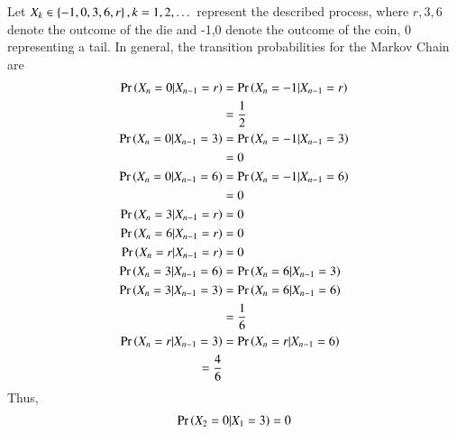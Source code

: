 Let $X_k \in \left\{-1,0,3,6,r\right\}, k = 1,2, \dots$ represent the described process, where $r,3,6$ denote the outcome of the die and -1,0 denote the outcome of the coin, 0 representing a tail.  In general, the transition probabilities for the Markov Chain are
\begin{align}
\Pr\left(X_n = 0|X_{n-1} = r\right) &=\Pr\left(X_n = -1|X_{n-1} = r\right) 
\\
&= \frac{1}{2}
\\
\Pr\left(X_n = 0|X_{n-1} = 3\right) &=\Pr\left(X_n = -1|X_{n-1} = 3\right) 
\\
&=0
\\
\Pr\left(X_n = 0|X_{n-1} = 6\right) &=\Pr\left(X_n = -1|X_{n-1} = 6\right) 
\\
&=0
\\
\Pr\left(X_n = 3|X_{n-1} = r\right) &= 0
\\
\Pr\left(X_n = 6|X_{n-1} = r\right) &= 0
\\
\Pr\left(X_n = r|X_{n-1} = r\right) &= 0
\\
\Pr\left(X_n = 3|X_{n-1} = 6\right) &= 
\Pr\left(X_n = 6|X_{n-1} = 3\right) 
\\
\Pr\left(X_n = 3|X_{n-1} = 3\right) &= 
\Pr\left(X_n = 6|X_{n-1} = 6\right) 
\\
&= \frac{1}{6}
\\
\Pr\left(X_n = r|X_{n-1} = 3\right) &= 
\Pr\left(X_n = r|X_{n-1} = 6\right) 
\\
= \frac{4}{6}
\end{align}
Thus,
\begin{align}
\Pr\left(X_2 = 0|X_1 = 3\right) = 0
\end{align}
